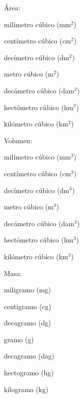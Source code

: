 \begin{multicols}{3}
\noindent
Área:

milímetro cúbico (mm$^2$)

centímetro cúbico (cm$^2$)

decímetro cúbico (dm$^2$)

metro cúbico (m$^2$)

decámetro cúbico (dam$^2$)

hectómetro cúbico (hm$^2$)

kilómetro cúbico (km$^2$)

\vspace{1cm}
\noindent
Volumen:

milímetro cúbico (mm$^3$)

centímetro cúbico (cm$^3$)

decímetro cúbico (dm$^3$)

metro cúbico (m$^3$)

decámetro cúbico (dam$^3$)

hectómetro cúbico (hm$^3$)

kilómetro cúbico (km$^3$)

\vspace{1cm}
\noindent
Masa:

miligramo (mg)

centigramo (cg)

decagramo (dg)

gramo (g)

decagramo (dag)

hectogramo (hg)

kilogramo (kg)
\end{multicols}

